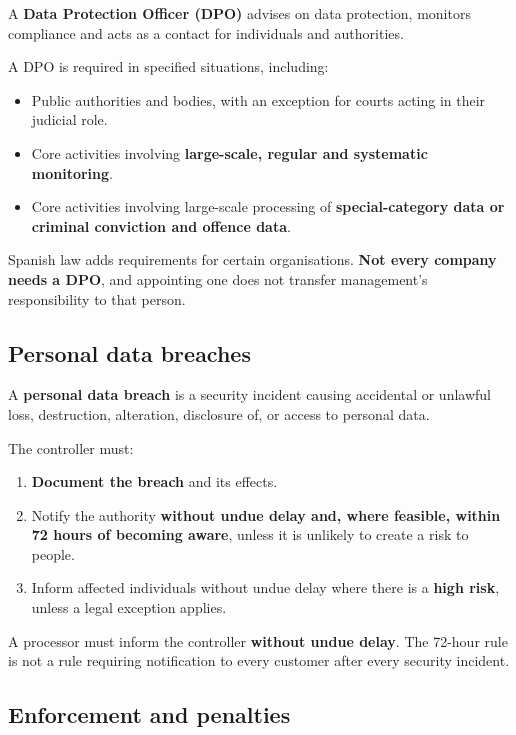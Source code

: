\documentclass[12pt,a4paper]{report}
\newcommand{\tightlist}{}
\begin{document}
A \textbf{Data Protection Officer (DPO)} advises on data protection, monitors compliance and acts as a contact for individuals and authorities.

A DPO is required in specified situations, including:

\begin{itemize}
\tightlist
\item
  Public authorities and bodies, with an exception for courts acting in their judicial role.
\item
  Core activities involving \textbf{large-scale, regular and systematic monitoring}.
\item
  Core activities involving large-scale processing of \textbf{special-category data or criminal conviction and offence data}.
\end{itemize}

Spanish law adds requirements for certain organisations. \textbf{Not every company needs a DPO}, and appointing one does not transfer management's responsibility to that person.

\hypertarget{personal-data-breaches}{%
\subsection{Personal data breaches}\label{personal-data-breaches}}

A \textbf{personal data breach} is a security incident causing accidental or unlawful loss, destruction, alteration, disclosure of, or access to personal data.

The controller must:

\begin{enumerate}
\def\labelenumi{\arabic{enumi}.}
\tightlist
\item
  \textbf{Document the breach} and its effects.
\item
  Notify the authority \textbf{without undue delay and, where feasible, within 72 hours of becoming aware}, unless it is unlikely to create a risk to people.
\item
  Inform affected individuals without undue delay where there is a \textbf{high risk}, unless a legal exception applies.
\end{enumerate}

A processor must inform the controller \textbf{without undue delay}. The 72-hour rule is not a rule requiring notification to every customer after every security incident.

\hypertarget{enforcement-and-penalties}{%
\subsection{Enforcement and penalties}\label{enforcement-and-penalties}}
\end{document}
